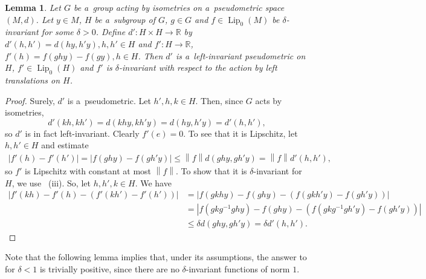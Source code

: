 \documentclass[11pt,a4paper]{amsart}
\newtheorem{lemma}[theorem]{Lemma}
\theoremstyle{definition}
\newcommand{\R}{\mathbb{R}}
\newcommand{\abs}[1]{\left| #1 \right|}
\newcommand{\norm}[1]{\left\| #1 \right\|}
\newcommand{\Lipz}{\operatorname{Lip}_0}
\begin{document}
	\begin{lemma} \label{lma:restrictionOfDeltaInv}
		Let $G$ be a~group acting by isometries on a~pseudometric space $(M, d)$. Let $y \in M$, $H$ be a~subgroup of $G$, $g \in G$ and $f \in \Lipz(M)$ be $\delta$-invariant for some $\delta > 0$. 
		Define $d': H \times H \to \R$ by $d'(h, h') = d(hy, h'y), h, h' \in H$ and $f': H \to \R$, $f'(h) = f(ghy) - f(gy), h\in H$.
		Then $d'$ is a~left-invariant pseudometric on $H$, $f' \in \Lipz(H)$ and $f'$ is $\delta$-invariant with respect to the action by left translations on $H$.
	\end{lemma}
	\begin{proof}
		Surely, $d'$ is a~pseudometric. Let $h',h,k \in H$. Then, since $G$ acts by isometries,
		\begin{equation*}
			d'(kh, kh') = d(khy, kh'y) = d(hy, h'y) = d'(h, h'),
		\end{equation*}
		so $d'$ is in fact left-invariant.
		Clearly $f'(e) = 0$. To see that it is Lipschitz, let $h,h' \in H$ and estimate
		\begin{align*}
			\abs{f'(h) - f'(h')}
			= \abs{f(ghy) - f(gh'y)}
			\leq \norm{f}d(ghy, gh'y)
			= \norm{f}d'(h,h'),
		\end{align*}
		so $f'$ is Lipschitz with constant at most $\norm{f}$. To show that it is $\delta$-invariant for $H$, we use ~(iii). So, let $h,h',k \in H$. We have
		\begin{align*}
			\abs{f'(kh) - f'(h) - (f'(kh') - f'(h'))}
			&= \abs{f(gkhy) - f(ghy) - (f(gkh'y) - f(gh'y))}\\
			&= \abs{f(gkg^{-1}ghy) - f(ghy) - (f(gkg^{-1}gh'y) - f(gh'y))}\\
			&\leq \delta d(ghy, gh'y)
			= \delta d'(h,h').
		\end{align*}
	\end{proof}
	
	Note that the following lemma implies that, under its assumptions, the answer to  for $\delta < 1$ is trivially positive, since there are no $\delta$-invariant functions of norm $1$.
	
\end{document}
